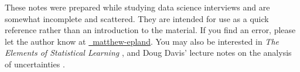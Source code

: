 \preface

These notes were prepared while studying data science interviews and are somewhat incomplete and scattered.
They are intended for use as a quick reference rather than an introduction to the material.
If you find an error, please let the author know at \href{https://www.linkedin.com/in/matthew-epland/}{{\small\faLinkedinSquare}~matthew-epland}.
You may also be interested in \textit{The Elements of Statistical Learning} \cite{HastieTF09},
and Doug Davis' lecture notes on the analysis of uncertainties \cite{DougNotes}.
